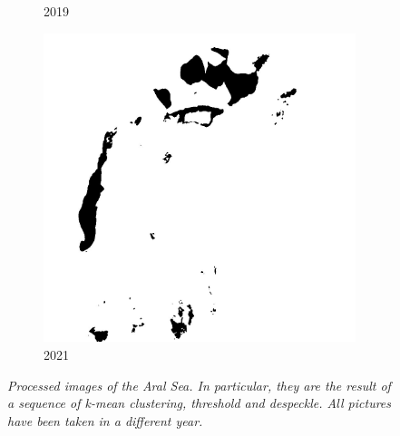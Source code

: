 \documentclass[12pt,a4paper]{article}
\begin{document}
\begin{figure}[H]
\begin{subfigure}[b]{0.19\textwidth}
        \caption{2019}
    \end{subfigure}
    \begin{subfigure}[b]{0.19\textwidth}
        \centering
        \includegraphics[width=\textwidth]{../img/2021w.jpg}
        \caption{2021}
    \end{subfigure}
    \caption{\emph{Processed images of the Aral Sea.
            In particular, they are the result of a sequence of k-mean clustering, threshold and despeckle.
            All pictures have been taken in a different year.}}
    \label{fig:appendixsurface}
\end{figure}
\end{document}
